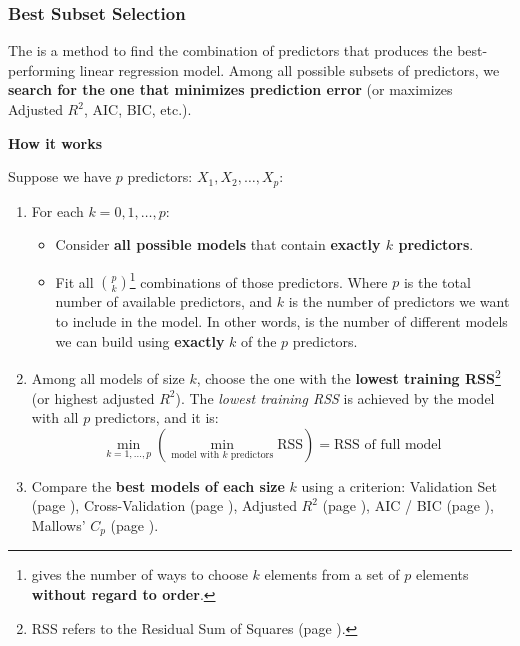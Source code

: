\subsubsection{Best Subset Selection}\label{subsubsection: Best Subset Selection}

The  is a method to find the combination of predictors that produces the best-performing linear regression model. Among all possible subsets of predictors, we \textbf{search for the one that minimizes prediction error} (or maximizes Adjusted $R^2$, AIC, BIC, etc.).

\highspace
\begin{flushleft}
    \textcolor{Green3}{ \textbf{How it works}}
\end{flushleft}
Suppose we have $p$ predictors: $X_1, X_2, \dots, X_p$:
\begin{enumerate}
    \item For each $k = 0, 1, \dots, p$:
    \begin{itemize}
        \item Consider \textbf{all possible models} that contain \textbf{exactly $k$ predictors}.
        \item Fit all $\binom{p}{k}$\footnote{%
             gives the number of ways to choose $k$ elements from a set of $p$ elements \textbf{without regard to order}.
        } combinations of those predictors. Where $p$ is the total number of available predictors, and $k$ is the number of predictors we want to include in the model. In other words, is the number of different models we can build using \textbf{exactly} $k$ of the $p$ predictors.
    \end{itemize}

    \item Among all models of size $k$, choose the one with the \textbf{lowest training RSS}\footnote{%
        RSS refers to the Residual Sum of Squares (page \pageref{eq: RSS}).
    } (or highest adjusted $R^2$). The \emph{lowest training RSS} is achieved by the model with all $p$ predictors, and it is:
    \begin{equation*}
        \min_{k=1,\dots,p} \left( \min_{\text{model with }k\text{ predictors}} \text{RSS} \right) = \text{RSS of full model}
    \end{equation*}

    \item Compare the \textbf{best models of each size} $k$ using a criterion: Validation Set (page \pageref{paragraph: Validation Set}), Cross-Validation (page \pageref{paragraph: Cross-Validation}), Adjusted $R^{2}$ (page \pageref{paragraph: Adjusted R2}), AIC / BIC (page \pageref{paragraph: AIC and BIC}), Mallows' $C_p$ (page \pageref{paragraph: Mallows' Cp}).
\end{enumerate}

